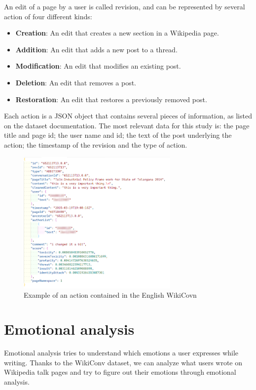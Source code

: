 An edit of a page by a user is called revision, and can be represented by several action of four different kinds:

\begin{itemize}
\item \textbf{Creation}: An edit that creates a new section in a Wikipedia page.
\item \textbf{Addition}: An edit that adds a new post to a thread.
\item \textbf{Modification}: An edit that modifies an existing post.
\item \textbf{Deletion}: An edit that removes a post.
\item \textbf{Restoration}: An edit that restores a previously removed post.
\end{itemize}

Each action is a JSON object that contains several pieces of information, as listed on the dataset documentation. The most relevant data for this study is: the page title and page id; the user name and id; the text of the post underlying the action; the timestamp of the revision and the type of action.


\begin{figure}[H]
    \centering
    \includegraphics[width=0.7\textwidth]{./img/wikiconv.png}
    \caption{Example of an action contained in the English WikiCovn}
    \label{fig:wikiconv}
\end{figure}


\section{Emotional analysis}

Emotional analysis tries to understand which emotions a user expresses while writing. Thanks to the WikiConv dataset, we can analyze what users wrote on Wikipedia talk pages and try to figure out their emotions through emotional analysis.

